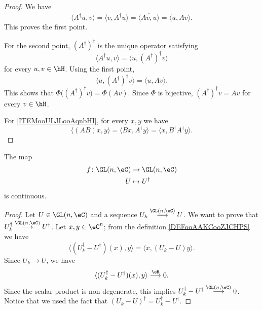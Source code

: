 \begin{proof}
    We have
    \begin{equation}
        \langle A^{\dag}u, v\rangle =\overline{ \langle v, A^{\dag}u\rangle  }=\overline{ \langle Av, u\rangle  }=\langle u, Av\rangle .
    \end{equation}
    This proves the first point.

    For the second point, \( (A^{\dag})^{\dag}\) is the unique operator satisfying
    \begin{equation}
        \langle A^{\dag}u, v\rangle =\langle u, (A^{\dag})^{\dag}v\rangle 
    \end{equation}
    for every \( u,v\in \hH\). Using the first point,
    \begin{equation}
        \langle u, (A^{\dag})^{\dag} v\rangle =\langle u, Av\rangle .
    \end{equation}
    This shows that \( \Phi\big( (A^{\dag})^{\dag}v \big)=\Phi(Av)\). Since \( \Phi\) is bijective, \( (A^{\dag})^{\dag}v=Av\) for every \( v\in \hH\).

    For \ref{ITEMooULJLooAqnbHI}, for every \( x,y\) we have
    \begin{equation}
        \langle (AB)x, y\rangle =\langle Bx, A^{\dag}y\rangle =\langle x, B^{\dag}A^{\dag} y\rangle .
    \end{equation}
\end{proof}

\begin{lemma}        \label{LEMooZILJooFfDEAF}
    The map
    \begin{equation}
        \begin{aligned}
            f\colon \GL(n,\eC)&\to \GL(n,\eC) \\
            U&\mapsto U^{\dag} 
        \end{aligned}
    \end{equation}
    is continuous.
\end{lemma}

\begin{proof}
    Let \( U\in\GL(n,\eC)\) and a sequence \( U_k\stackrel{\GL(n,\eC)}{\longrightarrow}U\). We want to prove that \( U_k^{\dag}\stackrel{\GL(n,\eC)}{\longrightarrow}U^{\dag}\). Let \( x,y\in \eC^n\); from the definition \ref{DEFooAAKCooZJCHPS} we have
    \begin{equation}
        \langle (U_k^{\dag}-U^{\dag})(x),y \rangle =\langle x, (U_k-U)y \rangle .
    \end{equation}
    Since \( U_k\to U\), we have
    \begin{equation}
        \langle (U_k^{\dag}-U^{\dag})(x),y \rangle \stackrel{\eR}{\longrightarrow}0.
    \end{equation}
    Since the scalar product is non degenerate, this implies \( U_k^{\dag}-U^{\dag}\stackrel{\GL(n,\eC)}{\longrightarrow}0\). Notice that we used the fact that \( (U_k-U)^{\dag}=U_k^{\dag}-U^{\dag}\).
\end{proof}

